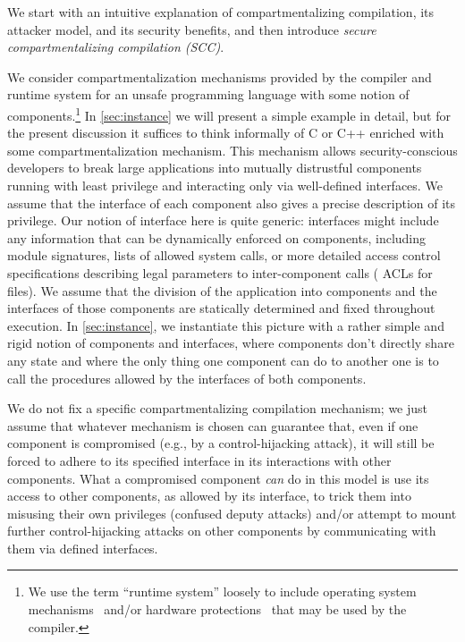 \documentclass[10pt, conference, compsocconf, letterpaper, times]{IEEEtran}
\begin{document}
We start with an intuitive explanation of compartmentalizing compilation,
its attacker model, and its security benefits, and then introduce {\em
  secure compartmentalizing compilation (SCC)}.

We consider compartmentalization mechanisms provided by the
compiler and runtime system for an unsafe programming language with some
notion of components.\footnote{We use the term ``runtime system'' loosely to include operating
  system mechanisms~\cite{Kilpatrick03, GudkaWACDLMNR15, wedge_nsdi2008,
    ProvosFH03, ReisG09} and/or hardware
  protections~\cite{micropolicies2015,sgx,PatrignaniDP16,cheri_oakland2015}
  that may be used by the compiler.}
In \autoref{sec:instance} we will present a simple example in detail,
but for the present discussion it suffices to think informally of C or
C++ enriched with some compartmentalization mechanism.
This mechanism allows security-conscious developers to break large
applications into mutually distrustful components running with
least privilege and interacting only via well-defined interfaces.
We assume that the interface of each component also gives a precise
description of its privilege.
Our notion of interface here is quite generic: interfaces might include any
information that can be dynamically enforced on components, including module
signatures, lists of allowed system calls, or more detailed access control
specifications describing legal parameters to inter-component calls (\EG
ACLs for files).
We assume that the division of the application into components and the
interfaces of those components are statically determined and fixed
throughout execution.
In \autoref{sec:instance}, we instantiate this picture with a rather simple
and rigid notion of components and interfaces, where components don't
directly share any state and where the only thing one component can do to
another one is to call the procedures allowed by the interfaces of both
components.







We do not fix a specific compartmentalizing compilation mechanism; we
just assume that whatever mechanism is chosen can guarantee that, even
if one component is compromised (e.g., by a control-hijacking attack),
it will still be forced to adhere to its specified interface in its
interactions with other components.
What a compromised component {\em can} do in this model is use its access
to other components, as allowed by its interface, to trick them into
misusing their own privileges (confused deputy attacks) and/or attempt to
mount further control-hijacking attacks on other
components by communicating with them via defined
interfaces.
\end{document}
